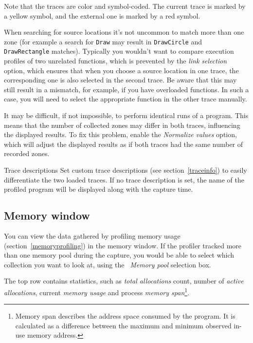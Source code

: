 \documentclass[hidelinks,titlepage,a4paper]{article}
\begin{document}
Note that the traces are color and symbol-coded. The current trace is marked by a yellow \faLemon{} symbol, and the external one is marked by a red \faGem{} symbol.

When searching for source locations it's not uncommon to match more than one zone (for example a search for \texttt{Draw} may result in \texttt{DrawCircle} and \texttt{DrawRectangle} matches). Typically you wouldn't want to compare execution profiles of two unrelated functions, which is prevented by the \emph{link selection} option, which ensures that when you choose a source location in one trace, the corresponding one is also selected in the second trace. Be aware that this may still result in a mismatch, for example, if you have overloaded functions. In such a case, you will need to select the appropriate function in the other trace manually.

It may be difficult, if not impossible, to perform identical runs of a program. This means that the number of collected zones may differ in both traces, influencing the displayed results. To fix this problem, enable the \emph{Normalize values} option, which will adjust the displayed results as if both traces had the same number of recorded zones.

\begin{bclogo}[
noborder=true,
couleur=black!5,
logo=\bclampe
]{Trace descriptions}
Set custom trace descriptions (see section~\ref{traceinfo}) to easily differentiate the two loaded traces. If no trace description is set, the name of the profiled program will be displayed along with the capture time.
\end{bclogo}

\subsection{Memory window}
\label{memorywindow}

You can view the data gathered by profiling memory usage (section~\ref{memoryprofiling}) in the memory window. If the profiler tracked more than one memory pool during the capture, you would be able to select which collection you want to look at, using the \emph{\faArchive{}~Memory pool} selection box.

The top row contains statistics, such as \emph{total allocations} count, number of \emph{active allocations}, current \emph{memory usage} and process \emph{memory span}\footnote{Memory span describes the address space consumed by the program. It is calculated as a difference between the maximum and minimum observed in-use memory address.}.
\end{document}
